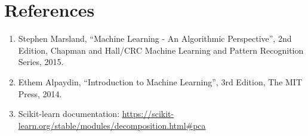\documentclass[12pt,a4paper]{article}
\begin{document}
\section{References}
\begin{enumerate}
\item Stephen Marsland, ``Machine Learning - An Algorithmic Perspective'', 2nd Edition, Chapman and
Hall/CRC Machine Learning and Pattern Recognition Series, 2015.
\item Ethem Alpaydin, ``Introduction to Machine Learning'', 3rd Edition, The MIT Press, 2014.
\item Scikit-learn documentation: \url{https://scikit-learn.org/stable/modules/decomposition.html\#pca}
\end{enumerate}
\end{document}
